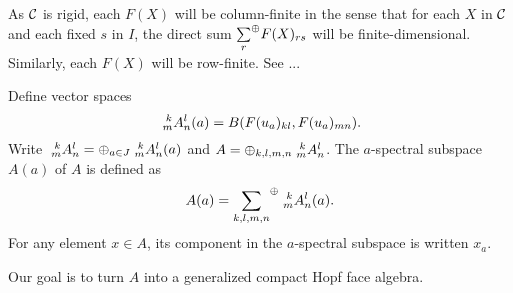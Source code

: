 As $\CatC$ is rigid, each $F(X)$ will be column-finite in the sense that for each $X$ in $\CatC$ and each fixed $s$ in $I$, the direct sum $\osum{r} F(X)_{rs}$ will be finite-dimensional. Similarly, each $F(X)$ will be row-finite. See ...



Define vector spaces \[\Gr{A}{k}{l}{m}{n}(a) = B(F(u_a)_{kl}, F(u_a)_{mn}).\] Write $\Gr{A}{k}{l}{m}{n} = \oplus_{a\in J} \Gr{A}{k}{l}{m}{n}(a)$ and $A = \oplus_{k,l,m,n} \Gr{A}{k}{l}{m}{n}$. The $a$-spectral subspace $A(a)$ of $A$ is defined as \[A(a) = \osum{k,l,m,n} \Gr{A}{k}{l}{m}{n}(a).\] For any element $x\in A$, its component in the $a$-spectral subspace is written $x_a$.

Our goal is to turn $A$ into a generalized compact Hopf face algebra.



